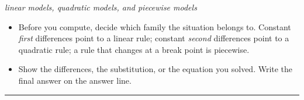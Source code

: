 \documentclass[12pt]{article}
\begin{document}

\begin{center}\small\textit{linear models, quadratic models, and piecewise models}\end{center}

\begin{itemize}[leftmargin=0.8cm, itemsep=1pt, topsep=2pt]
  \item Before you compute, decide which family the situation belongs to. Constant \emph{first} differences point to a linear rule; constant \emph{second} differences point to a quadratic rule; a rule that changes at a break point is piecewise.
  \item Show the differences, the substitution, or the equation you solved. Write the final answer on the answer line.
\end{itemize}

\vspace{0.2cm}\noindent\rule{\linewidth}{0.4pt}

\end{document}
